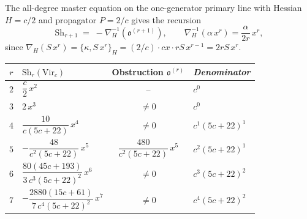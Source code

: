 The all-degree master equation on the one-generator primary line
with Hessian $H = c/2$ and propagator $P = 2/c$ gives the
recursion
\begin{equation}\label{eq:thqg-master-recursion}
\mathrm{Sh}_{r+1}
\;=\;
-\nabla_H^{-1}(\mathfrak{o}^{(r+1)}),
\qquad
\nabla_H^{-1}(\alpha\,x^r)
= \frac{\alpha}{2r}\,x^r,
\end{equation}
since $\nabla_H(S\,x^r) = \{\kappa, S\,x^r\}_H =
(2/c)\cdot cx \cdot rS\,x^{r-1} = 2rS\,x^r$.

\begin{theorem}
\label{thm:thqg-virasoro-tower-explicit}
\ClaimStatusProvedHere
{}
\begin{center}
\small
\renewcommand{\arraystretch}{1.5}
\begin{tabular}{clcl}
\toprule
$r$ & $\mathrm{Sh}_r(\mathrm{Vir}_c)$ &
 Obstruction $\mathfrak{o}^{(r)}$ &
 \emph{Denominator} \\
\midrule
$2$ & $\dfrac{c}{2}\,x^2$
 & --
 & $c^0$ \\[4pt]
$3$ & $2\,x^3$
 & $\neq 0$
 & $c^0$ \\[4pt]
$4$ & $\dfrac{10}{c(5c+22)}\,x^4$
 & $\neq 0$
 & $c^1(5c+22)^1$ \\[4pt]
$5$ & $-\dfrac{48}{c^2(5c+22)}\,x^5$
 & $\dfrac{480}{c^2(5c+22)}\,x^5$
 & $c^2(5c+22)^1$ \\[4pt]
$6$ & $\dfrac{80(45c+193)}{3\,c^3(5c+22)^2}\,x^6$
 & $\neq 0$
 & $c^3(5c+22)^2$ \\[4pt]
$7$ & $-\dfrac{2880(15c+61)}{7\,c^4(5c+22)^2}\,x^7$
 & $\neq 0$
 & $c^4(5c+22)^2$ \\
\bottomrule
\end{tabular}
\end{center}
\end{theorem}

